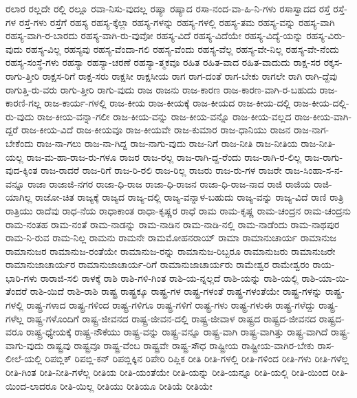 {ರಲಾರ
ರಲ್ಲದೇ
ರಲ್ಲಿ
ರಲ್ಲೂ
ರವಾ-ನಿಸು-ವುದಲ್ಲ
ರಷ್ಯಾ
ರಷ್ಯಾದ
ರಸಾ-ನಂದ-ವಾ-ಹಿ-ನಿ-ಗಳು
ರಸಾಸ್ವಾದದ
ರಸ್ತೆ
ರಸ್ತೆ-ಗಳ
ರಸ್ತೆ-ಗಳು
ರಸ್ತೆಗೆ
ರಹಸ್ಯ
ರಹಸ್ಯ-ಕ್ಕೆಲ್ಲಾ
ರಹಸ್ಯ-ಗಳನ್ನು
ರಹಸ್ಯ-ಗಳಲ್ಲಿ
ರಹಸ್ಯ-ತಮ
ರಹಸ್ಯ-ವನ್ನು
ರಹಸ್ಯ-ವಾಗಿ
ರಹಸ್ಯ-ವಾಗಿ-ರ-ಬಾರದು
ರಹಸ್ಯ-ವಾಗಿ-ರು-ವುವೋ
ರಹಸ್ಯ-ವಿದೆ
ರಹಸ್ಯ-ವಿದೆಯೇ
ರಹಸ್ಯ-ವಿದ್ಯೆ-ಯನ್ನು
ರಹಸ್ಯ-ವಿರು-ವುದು
ರಹಸ್ಯ-ವಿಲ್ಲ
ರಹಸ್ಯವು
ರಹಸ್ಯ-ವೆಂದಾ-ಗಲಿ
ರಹಸ್ಯ-ವೆಂದು
ರಹಸ್ಯ-ವೆಲ್ಲ
ರಹಸ್ಯ-ವೇ-ನಿಲ್ಲ
ರಹಸ್ಯ-ವೇ-ನೆಂದು
ರಹಸ್ಯ-ಸಂಸ್ಥೆ-ಗಳು
ರಹಸ್ಯಾ
ರಹಸ್ಯಾ-ಚರಣೆ
ರಹಸ್ಯಾ-ತ್ಮಕವೂ
ರಹಿತ
ರಹಿತ-ವಾದ
ರಹಿತ-ವಾದುದು
ರಾಕ್ಷ-ಸರ
ರಕ್ಕಸ-ರಾಗು-ತ್ತೀರಿ
ರಾಕ್ಷಸ-ರಿಗೆ
ರಾಕ್ಷ-ಸರು
ರಾಕ್ಷಸೀ
ರಾಕ್ಷಸೀಯ
ರಾಗ
ರಾಗ-ದಂತೆ
ರಾಗ-ಬೇಕು
ರಾಗಲೇ
ರಾಗಿ
ರಾಗಿ-ದ್ದೆವು
ರಾಗುತ್ತಿ-ರು-ವರು
ರಾಗು-ತ್ತೀರಿ
ರಾಗು-ವುದು
ರಾಜ
ರಾಜನು
ರಾಜ-ಕಾರಣ
ರಾಜ-ಕಾರಣ-ವಾಗಿ-ರ-ಬಹುದು
ರಾಜ-ಕಾರಣಿ-ಗಲ್ಲ
ರಾಜ-ಕಾರ್ಯ-ಗಳಲ್ಲಿ
ರಾಜ-ಕೀಯ
ರಾಜ-ಕೀಯಕ್ಕೆ
ರಾಜ-ಕೀಯದ
ರಾಜ-ಕೀಯ-ದಲ್ಲಿ
ರಾಜ-ಕೀಯ-ದಲ್ಲಿ-ರು-ವುದು
ರಾಜ-ಕೀಯ-ವನ್ನಾ-ಗಲೀ
ರಾಜ-ಕೀಯ-ವನ್ನು
ರಾಜ-ಕೀಯ-ವನ್ನೊ
ರಾಜ-ಕೀಯ-ವಲ್ಲದ
ರಾಜ-ಕೀಯ-ವಾಗಿ-ದ್ದರೆ
ರಾಜ-ಕೀಯ-ವಿದೆ
ರಾಜ-ಕೀಯವೂ
ರಾಜ-ಕೀಯವೇ
ರಾಜ-ಕುಮಾರ
ರಾಜ-ಧಾನಿಯು
ರಾಜನ
ರಾಜ-ನಾಗ-ಬೇಕೆಂದು
ರಾಜ-ನಾ-ಗಲು
ರಾಜ-ನಾ-ಗಿದ್ದ
ರಾಜ-ನಾಗು-ವುದು
ರಾಜ-ನಿಗೆ
ರಾಜ-ನೀತಿ
ರಾಜ-ನೀತಿಯ
ರಾಜ-ನೀತಿ-ಯಲ್ಲ
ರಾಜ-ಮ-ಹಾ-ರಾಜ-ರು-ಗಳೂ
ರಾಜರ
ರಾಜ-ರಲ್ಲ
ರಾಜ-ರಾಗಿ-ದ್ದ-ರೆಂದು
ರಾಜ-ರಾಗಿ-ರ-ಲಿಲ್ಲ
ರಾಜ-ರಾಗು-ವುದ-ಕ್ಕಿಂತ
ರಾಜ-ರಾದರೆ
ರಾಜ-ರಿಗೆ
ರಾಜ-ರಿ-ರಲಿ
ರಾಜ-ರಿಲ್ಲ
ರಾಜರು
ರಾಜ-ರು-ಗಳ
ರಾಜರೇ
ರಾಜ-ಸಿಂಹಾ-ಸ-ನ-ವನ್ನೂ
ರಾಜಾ
ರಾಜಾಜಿ-ನಗರ
ರಾಜಾ-ಧಿ-ರಾಜ
ರಾಜಾ-ಧಿ-ರಾಜನ
ರಾಜಾ-ಧಿ-ರಾಜ-ನಾದ
ರಾಜಿ
ರಾಜಿಯ
ರಾಜಿ-ಯಾಗಿಲ್ಲ
ರಾಜೋ-ಚಿತ
ರಾಜ್ಯಕ್ಕೆ
ರಾಜ್ಯದ
ರಾಜ್ಯ-ದಲ್ಲಿ
ರಾಜ್ಯ-ವನ್ನಾಳ-ಬಹುದು
ರಾಜ್ಯ-ವನ್ನು
ರಾಜ್ಯ-ವಿದೆ
ರಾಣಿ
ರಾತ್ರಿ
ರಾತ್ರಿಯು
ರಾದೆವು
ರಾಧ-ನೆಯ
ರಾಧಾಕಾಂತ
ರಾಧಾ-ಕೃಷ್ಣರ
ರಾಧೆ
ರಾಮ
ರಾಮ-ಕೃಷ್ಣ
ರಾಮ-ಚಂದ್ರನ
ರಾಮ-ಚಂದ್ರನು
ರಾಮ-ನಂತಹ
ರಾಮ-ನಂತೆ
ರಾಮ-ನಾಡನ್ನು
ರಾಮ-ನಾಡಿನ
ರಾಮ-ನಾಡಿ-ನಲ್ಲಿ
ರಾಮ-ನಾಡೆಂದು
ರಾಮ-ನಾಥಪುರ
ರಾಮ-ನಿ-ರುವ
ರಾಮ-ನಿಲ್ಲ
ರಾಮನು
ರಾಮನೇ
ರಾಮಮೋಹನರಾಯ್
ರಾಮಾ
ರಾಮಾನುಚಾರ್ಯ
ರಾಮಾನುಜ
ರಾಮಾನುಜರ
ರಾಮಾನುಜ-ರಂತೆಯೇ
ರಾಮಾನುಜ-ರನ್ನು
ರಾಮಾನುಜ-ರಿಬ್ಬರೂ
ರಾಮಾನುಜರು
ರಾಮಾನುಜರೇ
ರಾಮಾನುಜಾಚಾರ್ಯರ
ರಾಮಾನುಜಾಚಾರ್ಯ-ರಿಗೆ
ರಾಮಾನುಜಾಚಾರ್ಯರು
ರಾಮೇಶ್ವರ
ರಾಮೇಶ್ವರಂ
ರಾಯ-ಭಾರಿ-ಗಳು
ರಾರಾಜಿ-ಸಲಿ
ರಾಳಕ್ಕೆ
ರಾಶಿ
ರಾಶಿ-ಗಳಿ-ಗಿಂತ
ರಾಶಿ-ಯ-ನ್ನಲ್ಲದೆ
ರಾಶಿ-ಯನ್ನು
ರಾಶಿ-ಯಲ್ಲಿ
ರಾಶಿ-ಯಾ-ಯಿ-ತೆಂದರೆ
ರಾಶಿ-ಯಿದೆ
ರಾಶಿ-ರಾಶಿ
ರಾಷ್ಟ್ರ
ರಾಷ್ಟ್ರಕ್ಕೂ
ರಾಷ್ಟ್ರ-ಗಳ
ರಾಷ್ಟ್ರ-ಗಳಂತೆ
ರಾಷ್ಟ್ರ-ಗಳಂತೆಯೇ
ರಾಷ್ಟ್ರ-ಗಳನ್ನು
ರಾಷ್ಟ್ರ-ಗಳಲ್ಲಿ
ರಾಷ್ಟ್ರ-ಗಳಾದ
ರಾಷ್ಟ್ರ-ಗಳಿಂದ
ರಾಷ್ಟ್ರ-ಗಳಿಗೂ
ರಾಷ್ಟ್ರ-ಗಳಿಗೆ
ರಾಷ್ಟ್ರ-ಗಳು
ರಾಷ್ಟ್ರ-ಗಳುಈ
ರಾಷ್ಟ್ರ-ಗಳೆದ್ದು
ರಾಷ್ಟ್ರ-ಗಳೆಲ್ಲ
ರಾಷ್ಟ್ರ-ಗಳೊಂದಿಗೆ
ರಾಷ್ಟ್ರ-ಜೀವನದ
ರಾಷ್ಟ್ರ-ಜೀವನ-ದಲ್ಲಿ
ರಾಷ್ಟ್ರ-ಜೀವಾಳ
ರಾಷ್ಟ್ರದ
ರಾಷ್ಟ್ರದ-ಜೀವನದ
ರಾಷ್ಟ್ರದ-ವರೂ
ರಾಷ್ಟ್ರ-ಧ್ಯೇಯಕ್ಕೆ
ರಾಷ್ಟ್ರ-ನೌಕೆಯು
ರಾಷ್ಟ್ರ-ವನ್ನು
ರಾಷ್ಟ್ರ-ವನ್ನೂ
ರಾಷ್ಟ್ರ-ವಾಗಿ
ರಾಷ್ಟ್ರ-ವಾಗಿತ್ತು
ರಾಷ್ಟ್ರ-ವಾಗಿದೆ
ರಾಷ್ಟ್ರ-ವಾಗು-ವುದು
ರಾಷ್ಟ್ರವು
ರಾಷ್ಟ್ರವೂ
ರಾಷ್ಟ್ರ-ವೆಂಬ
ರಾಷ್ಟ್ರವೇ
ರಾಷ್ಟ್ರ-ಸೌಧ
ರಾಷ್ಟ್ರೀಯ
ರಾಷ್ಟ್ರೀಯ-ವಾಗಿರ-ಬೇಕು
ರಾಸ-ಲೀಲೆ-ಯಲ್ಲಿ
ರಿಪಬ್ಲಿಕ್
ರಿಪಬ್ಲಿ-ಕನ್
ರಿಪಬ್ಲಿಕ್ಕಿನ
ರಿಪೇರಿ
ರಿಪ್ಲಿಕ
ರೀತಿ
ರೀತಿ-ಗಳಲ್ಲಿ
ರೀತಿ-ಗಳಿಂದ
ರೀತಿ-ಗಳು
ರೀತಿ-ಗಳೆಲ್ಲ
ರೀತಿ-ಗಿಂತ
ರೀತಿ-ನೀತಿ-ಗಳೆಲ್ಲ
ರೀತಿಯ
ರೀತಿ-ಯಂತೆಯೇ
ರೀತಿ-ಯನ್ನು
ರೀತಿ-ಯನ್ನೂ
ರೀತಿ-ಯಲ್ಲಿ
ರೀತಿ-ಯಿಂದ
ರೀತಿ-ಯಿಂದ-ಲಾದರೂ
ರೀತಿ-ಯಿಲ್ಲ
ರೀತಿಯು
ರೀತಿಯೂ
ರೀತಿಯೆ
ರೀತಿಯೇ
}
